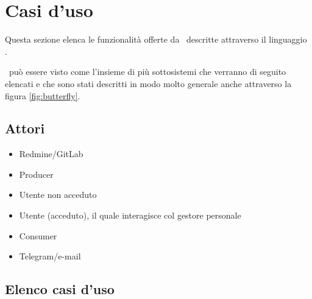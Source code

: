 \section{Casi d'uso}
Questa sezione elenca le funzionalità offerte da \progetto\ descritte attraverso il linguaggio . 

\progetto\ può essere visto come l'insieme di più sottosistemi che verranno di seguito elencati e che sono stati descritti in modo molto generale anche attraverso la figura \ref{fig:butterfly}.
	
	\subsection{Attori}
	\begin{itemize}
		\item Redmine/GitLab
		\item Producer
		\item Utente non acceduto
		\item Utente (acceduto), il quale interagisce col gestore personale
		\item Consumer
		\item Telegram/e-mail
	\end{itemize}
	
	\subsection{Elenco casi d'uso}



